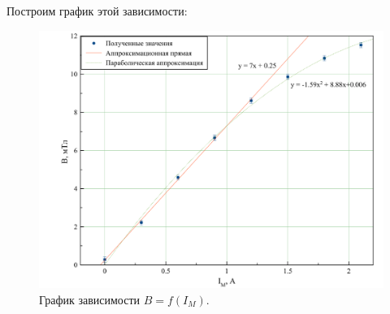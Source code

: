 \documentclass[a4paper, 12pt, twoside]{article}
\begin{document}
Построим график этой зависимости:

	\begin{figure}[H]
	\centering
	\includegraphics[width = 0.8 \textwidth]{grph1}
	\caption{График зависимости $B = f(I_M)$.}
	
\end{figure}
\end{document}

